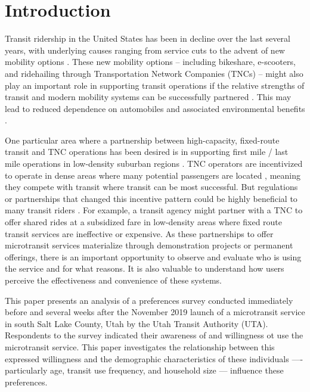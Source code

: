 \documentclass[smartcities,article,submit,moreauthors,pdftex]{mdpi}
\begin{document}

\hypertarget{intro}{%
\section{Introduction}\label{intro}}

Transit ridership in the United States has been in decline over the last several
years, with underlying causes ranging from service cuts to the advent of new
mobility options \citep{Graehler2019, Mallett2018}. These new mobility options --
including bikeshare, e-scooters, and ridehailing through Transportation Network
Companies (TNCs) -- might also play an important role in supporting transit
operations if the relative strengths of transit and modern mobility systems can
be successfully partnered \citep{Shaheen2016, OOSTENDORP201872, ShivThesis}. This
may lead to reduced dependence on automobiles and associated environmental
benefits \citep{hoehne2017greenhouse}.

One particular area where a partnership between high-capacity, fixed-route
transit and TNC operations has been desired is in supporting first mile / last
mile operations in low-density suburban regions \citep{Shaheen2016, alonso2018, Kang2020}. TNC operators are incentivized to operate in dense areas where many
potential passengers are located \citep{Wong2020}, meaning they compete with transit
where transit can be most successful. But regulations or partnerships that
changed this incentive pattern could be highly beneficial to many transit riders
\citep{Ronald2017, Deakin2010}. For example, a transit agency might partner with a
TNC to offer shared rides at a subsidized fare in low-density areas where fixed
route transit services are ineffective or expensive. As these partnerships to
offer microtransit services materialize through demonstration projects or
permanent offerings, there is an important opportunity to observe and evaluate
who is using the service and for what reasons. It is also valuable to understand
how users perceive the effectiveness and convenience of these systems.

This paper presents an analysis of a preferences survey conducted immediately before and
several weeks after the November 2019 launch of a microtransit service in south
Salt Lake County, Utah by the Utah Transit Authority (UTA). Respondents to the
survey indicated their awareness of and willingness ot use the microtransit service.
This paper investigates the relationship between this expressed willingness
and the demographic characteristics of these individuals ---- particularly age,
transit use frequency, and household size --- influence these preferences.
\end{document}
